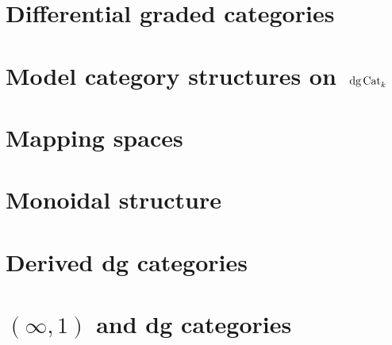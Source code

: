 \section{Differential graded categories}

\section{Model category structures on~$\textrm{dg\,Cat}_k$}

\section{Mapping spaces}

\section{Monoidal structure}

\section{Derived dg categories}

\section{$(\infty,1)$ and dg categories}
